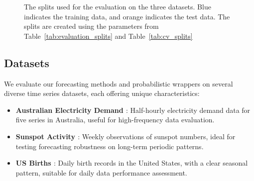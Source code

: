 \begin{figure}
\begin{subfigure}{1\textwidth}
    \end{subfigure}
    \caption{The splits used for the evaluation on the three datasets. Blue indicates the training data, and orange indicates the test data. The splits are created using the parameters from Table~\ref{tab:evaluation_splits} and Table~\ref{tab:cv_splits}}
    \label{fig:splits}
\end{figure}

\subsection{Datasets} \label{datasets}
We evaluate our forecasting methods and probabilistic wrappers on several diverse time series datasets, each offering unique characteristics:

\begin{itemize}
    \item \textbf{Australian Electricity Demand \cite{Godahewa2021Australian}}: Half-hourly electricity demand data for five series in Australia, useful for high-frequency data evaluation.
    \item \textbf{Sunspot Activity \cite{Godahewa2021Sunspot}}: Weekly observations of sunspot numbers, ideal for testing forecasting robustness on long-term periodic patterns.
    \item \textbf{US Births \cite{Godahewa2021USBirth}}: Daily birth records in the United States, with a clear seasonal pattern, suitable for daily data performance assessment.
\end{itemize}




